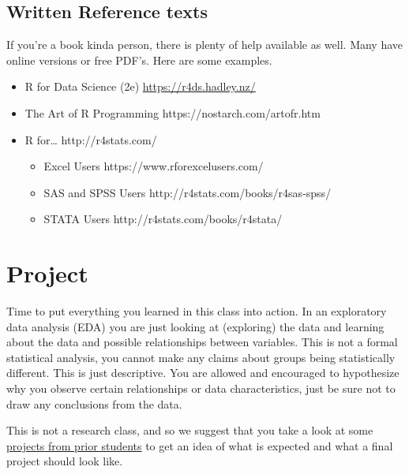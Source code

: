 \documentclass[
  letterpaper,
  DIV=11,
  numbers=noendperiod,
  oneside]{scrreprt}
\providecommand{\tightlist}{%
  \setlength{\itemsep}{0pt}\setlength{\parskip}{0pt}}\usepackage{longtable,booktabs,array}
\begin{document}
\section*{Written Reference texts}\label{written-reference-texts}


If you're a book kinda person, there is plenty of help available as
well. Many have online versions or free PDF's. Here are some examples.

\begin{itemize}
\tightlist
\item
  R for Data Science (2e) \url{https://r4ds.hadley.nz/}
\item
  The Art of R Programming https://nostarch.com/artofr.htm
\item
  R for\ldots{} http://r4stats.com/

  \begin{itemize}
  \tightlist
  \item
    Excel Users https://www.rforexcelusers.com/
  \item
    SAS and SPSS Users http://r4stats.com/books/r4sas-spss/
  \item
    STATA Users http://r4stats.com/books/r4stata/
  \end{itemize}
\end{itemize}

\chapter*{Project}\label{project}


Time to put everything you learned in this class into action. In an
exploratory data analysis (EDA) you are just looking at (exploring) the
data and learning about the data and possible relationships between
variables. This is not a formal statistical analysis, you cannot make
any claims about groups being statistically different. This is just
descriptive. You are allowed and encouraged to hypothesize why you
observe certain relationships or data characteristics, just be sure not
to draw any conclusions from the data.

\begin{tcolorbox}[enhanced jigsaw, bottomrule=.15mm, colback=white, colframe=quarto-callout-tip-color-frame, toprule=.15mm, coltitle=black, rightrule=.15mm, opacitybacktitle=0.6, colbacktitle=quarto-callout-tip-color!10!white, toptitle=1mm, leftrule=.75mm, breakable, bottomtitle=1mm, titlerule=0mm, title=\textcolor{quarto-callout-tip-color}{\faLightbulb}\hspace{0.5em}{See prior examples}, arc=.35mm, left=2mm, opacityback=0]

This is not a research class, and so we suggest that you take a look at
some
\href{https://drive.google.com/drive/folders/1EGyiCnCBocPAM5ouhbPIo0carF53by54}{projects
from prior students} to get an idea of what is expected and what a final
project should look like.

\end{tcolorbox}
\end{document}
